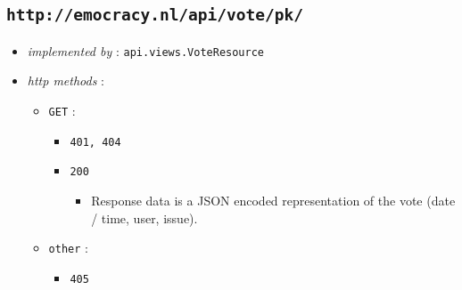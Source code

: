 \documentclass[a4paper]{report}
\begin{document}
\subsection{\texttt{http://emocracy.nl/api/vote/\textsf{pk}/}}
\begin{itemize}
    \item{\textsl{implemented by} : \texttt{api.views.VoteResource}}
    \item{\textsl{http methods} :
        \begin{itemize}
            \item{\texttt{GET} : 
                \begin{itemize}
                    \item{\texttt{401, 404}}
                    \item{\texttt{200}}
                    \begin{itemize}
                        \item{Response data is a JSON encoded representation of 
                        the vote (date / time, user, issue).
                        }
                    \end{itemize}
                \end{itemize}
            }
            \item{\texttt{other} :
                \begin{itemize}
                    \item{\texttt{405}}
                \end{itemize}
            }
        \end{itemize}
    }
\end{itemize}
\end{document}
